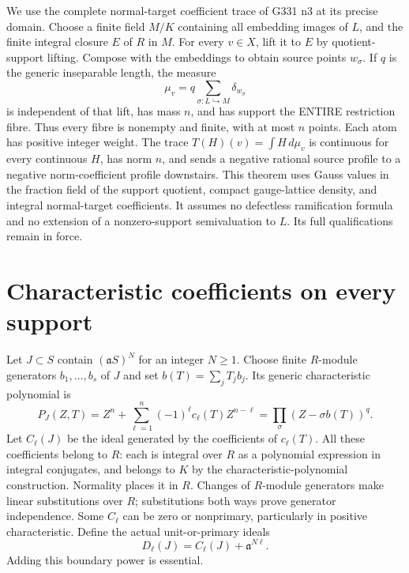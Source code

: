 \documentclass[11pt]{article}
\newcommand{\aa}{\mathfrak a}
\begin{document}
We use the complete normal-target coefficient trace of G331 n3 at its
precise domain. Choose a finite field $M/K$ containing all embedding
images of $L$, and the finite integral closure $E$ of $R$ in $M$.
For every $v\in X$, lift it to $E$ by quotient-support lifting.
Compose with the embeddings to obtain source points $w_\sigma$.
If $q$ is the generic inseparable length, the measure
\[
 \mu_v=q\sum_{\sigma:L\hookrightarrow M}\delta_{w_\sigma}
\]
is independent of that lift, has mass $n$, and has support the ENTIRE
restriction fibre. Thus every fibre is nonempty and finite, with at most
$n$ points. Each atom has positive integer weight. The trace
$T(H)(v)=\int H\,d\mu_v$ is continuous for every continuous $H$,
has norm $n$, and sends a negative rational source profile to a negative
norm-coefficient profile downstairs. This theorem uses Gauss values in
the fraction field of the support quotient, compact gauge-lattice density,
and integral normal-target coefficients. It assumes no defectless
ramification formula and no extension of a nonzero-support semivaluation
to $L$. Its full qualifications remain in force.

\section{Characteristic coefficients on every support}
Let $J\subset S$ contain $(\aa S)^N$ for an integer $N\ge1$.
Choose finite $R$-module generators $b_1,\ldots,b_s$ of $J$ and set
$b(T)=\sum_jT_jb_j$. Its generic characteristic polynomial is
\[
 P_J(Z,T)=Z^n+\sum_{\ell=1}^n(-1)^\ell c_\ell(T)Z^{n-\ell}
         =\prod_{\sigma}(Z-\sigma b(T))^q.
\]
Let $C_\ell(J)$ be the ideal generated by the coefficients of
$c_\ell(T)$. All these coefficients belong to $R$: each is integral over
$R$ as a polynomial expression in integral conjugates, and belongs to
$K$ by the characteristic-polynomial construction. Normality places it
in $R$. Changes of $R$-module generators make linear substitutions over
$R$; substitutions both ways prove generator independence.
Some $C_\ell$ can be zero or nonprimary, particularly in positive
characteristic. Define the actual unit-or-primary ideals
\[
 D_\ell(J)=C_\ell(J)+\aa^{N\ell}.
\]
Adding this boundary power is essential.
\end{document}
